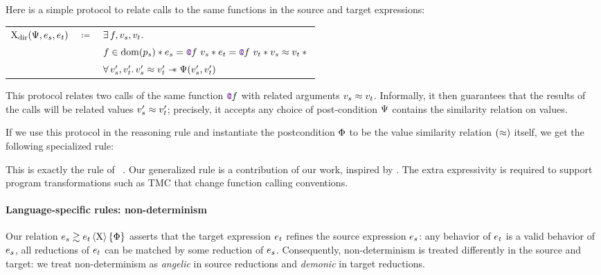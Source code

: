 Here is a simple protocol to relate calls to the same functions in the source and target expressions:

\begin{center}
\begin{tabular}{rcl}
        $\iProt_\mathrm{dir} (\iPredTwo, \datalangExpr_s, \datalangExpr_t)$
        & $\coloneqq$ &
        $\exists \datalangFn, \datalangVal_s, \datalangVal_t \ldotp$
    \\
        &&
        $\datalangFn \in \dom{\datalangProg_s} \iSep
        \datalangExpr_s = \datalangCall{\datalangFnptr{\datalangFn}}{\datalangVal_s} \iSep
        \datalangExpr_t = \datalangCall{\datalangFnptr{\datalangFn}}{\datalangVal_t} \iSep
        \datalangVal_s \iSimilar \datalangVal_t \iSep {}$
    \\
        &&
        $\forall \datalangVal_s', \datalangVal_t' \ldotp
        \datalangVal_s' \iSimilar \datalangVal_t' \iSepImp
        \iPredTwo (\datalangVal_s', \datalangVal_t')$
\end{tabular}
\end{center}

This protocol relates two calls of the same function $\datalangFnptr{\datalangFn}$
with related arguments $\datalangVal_s \iSimilar \datalangVal_t$. Informally, it then
guarantees that the results of the calls will be related values
$\datalangVal_s' \iSimilar \datalangVal_t'$; precisely, it accepts any choice of post-condition $\Psi$ contains the similarity relation on values.

If we use this protocol in the reasoning rule
 and instantiate the postcondition $\Phi$ to be the value similarity relation $(\approx)$ itself, we get the following specialized rule:
This is exactly the  rule of \Simuliris~\citep*{TODO-simuliris}. Our generalized rule  is a contribution of our work, inspired by \citet*{TODO-paulo}. The extra expressivity is required to support program transformations such as TMC that change function calling conventions.

\paragraph{Language-specific rules: non-determinism}
%
Our relation $\iSim[\iProt]{\iPred}{\datalangExpr_s}{\datalangExpr_t}$ asserts that the target expression $\datalangExpr_t$ refines the source expression $\datalangExpr_s$: any behavior of $\datalangExpr_t$ is a valid behavior of $\datalangExpr_s$, all reductions of $\datalangExpr_t$ can be matched by some reduction of $\datalangExpr_s$. Consequently, non-determinism is treated differently in the source and target: we treat non-determinism as \emph{angelic} in source reductions and \emph{demonic} in target reductions.

